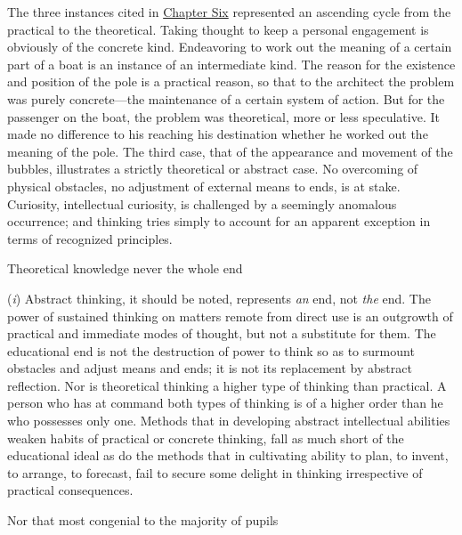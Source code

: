 \documentclass[letterpaper]{book}
\begin{document}
The three instances cited in
\protect\hyperlink{ux40publicux40vhostux40gux40gutenbergux40htmlux40filesux4037423ux4037423-hux4037423-h-2.htm.htmlux5cux23CHAPTER_SIX}{Chapter
Six} represented an ascending cycle from the practical to the
theoretical. Taking thought to keep a personal engagement is obviously
of the concrete kind. Endeavoring to work out the meaning of a certain
part of a boat is an instance of an intermediate kind. The reason for
the existence and position of the pole is a practical reason, so that to
the architect the problem was purely concrete---the maintenance of a
certain system of action. But for the passenger on the boat, the problem
was theoretical, more or less speculative. It made no difference to his
reaching his destination whether he worked out the meaning of the pole.
The third case, that of the appearance and movement of the bubbles,
illustrates a strictly theoretical or abstract case. No overcoming of
physical obstacles, no adjustment of external means to ends, is at
stake. Curiosity, intellectual curiosity, is challenged by a seemingly
anomalous occurrence; and thinking tries simply to account for an
apparent exception in terms of recognized principles.

Theoretical knowledge never the whole end

(\emph{i}) Abstract thinking, it should be noted, represents \emph{an}
end, not \emph{the} end. The power of sustained thinking on matters
remote from direct use is an outgrowth of practical and immediate modes
of thought, but not a substitute for them. The educational end is not
the destruction of power to think so as to surmount obstacles and adjust
means and ends; it is not its replacement by abstract reflection. Nor is
theoretical thinking a higher type of thinking than practical. A person
who has at command both types of thinking is of a higher order than he
who possesses only one. Methods that in
developing
abstract intellectual abilities weaken habits of practical or concrete
thinking, fall as much short of the educational ideal as do the methods
that in cultivating ability to plan, to invent, to arrange, to forecast,
fail to secure some delight in thinking irrespective of practical
consequences.

Nor that most congenial to the majority of pupils
\end{document}
